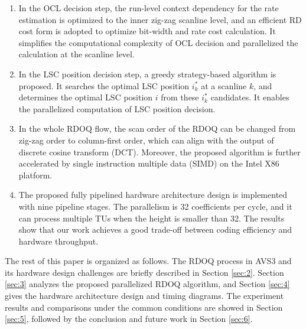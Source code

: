 \documentclass[lettersize,journal]{IEEEtran}
\begin{document}
\begin{enumerate}[]
	\item In the OCL decision step, the run-level context dependency for the rate estimation is optimized to the inner zig-zag scanline level, and an efficient RD cost form is adopted to optimize bit-width and rate cost calculation. It simplifies the computational complexity of OCL decision and parallelized the calculation at the scanline level. 
	 \item In the LSC position decision step, a greedy strategy-based algorithm is proposed. It searches the optimal LSC position $i_{k}^{*}$ at a scanline $k$, and determines the optimal LSC position $i$ from these $i_{k}^{*}$ candidates. It enables the parallelized computation of LSC position decision. 
	 \item In the whole RDOQ flow, the scan order of the RDOQ can be changed from zig-zag order to column-first order, which can align with the output of discrete cosine transform (DCT). Moreover, the proposed algorithm is further accelerated by single instruction multiple data (SIMD) on the Intel X86 platform. 
	\item The proposed fully pipelined hardware architecture design is implemented with nine pipeline stages. The parallelism is 32 coefficients per cycle, and it can process multiple TUs when the height is smaller than 32. The results show that our work achieves a good trade-off between coding efficiency and hardware throughput. 
\end{enumerate}
\par
The rest of this paper is organized as follows. The RDOQ process in AVS3 and its hardware design challenges are briefly described in Section \ref{sec:2}. Section \ref{sec:3} analyzes the proposed parallelized RDOQ algorithm, and Section \ref{sec:4} gives the hardware architecture design and timing diagrams. The experiment results and comparisons under the common conditions are showed in Section \ref{sec:5}, followed by the conclusion and future work in Section \ref{sec:6}. 
\end{document}
